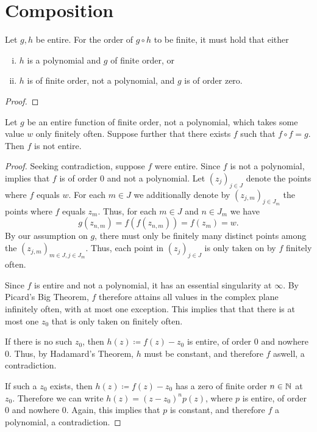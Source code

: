 \chapter{Composition}
\label{ch:composition}

\begin{theorem}[Pólya] \label{thm:polya}
    Let $g, h$ be entire. For the order of $g \circ h$ to be finite, it must hold that either
    \begin{enumerate}[i.]
        \item $h$ is a polynomial and $g$ of finite order, or
        \item $h$ is of finite order, not a polynomial, and $g$ is of order zero.
    \end{enumerate}
\end{theorem}

\begin{proof}
\end{proof}

\begin{theorem}[Thron] \label{thm:thron}
    Let $g$ be an entire function of finite order, not a polynomial, which takes some value $w$ only finitely often. Suppose further that there exists $f$ such that $f \circ f = g$. Then $f$ is not entire.
\end{theorem}

\begin{proof}
    Seeking contradiction, suppose $f$ were entire. Since $f$ is not a polynomial,  implies that $f$ is of order $0$ and not a polynomial. Let $(z_j)_{j \in J}$ denote the points where $f$ equals $w$. For each $m \in J$ we additionally denote by $(z_{j,m})_{j \in J_m}$ the points where $f$ equals $z_m$. Thus, for each $m \in J$ and $n \in J_m$ we have
    $$ g(z_{n,m}) = f(f(z_{n,m})) = f(z_m) = w. $$
    By our assumption on $g$, there must only be finitely many distinct points among the $(z_{j,m})_{m \in J, j \in J_m}$. Thus, each point in $(z_j)_{j \in J}$ is only taken on by $f$ finitely often.


    Since $f$ is entire and not a polynomial, it has an essential singularity at $\infty$. By Picard's Big Theorem, $f$ therefore attains all values in the complex plane infinitely often, with at most one exception. This implies that that there is at most one $z_0$ that is only taken on finitely often.

    If there is no such $z_0$, then $h(z) \coloneqq f(z) - z_0$ is entire, of order $0$ and nowhere $0$. Thus, by Hadamard's Theorem, $h$ must be constant, and therefore $f$ aswell, a contradiction.

    If such a $z_0$ exists, then $h(z) \coloneqq f(z) - z_0$ has a zero of finite order $n \in \mathbb{N}$ at $z_0$. Therefore we can write $h(z) = (z - z_0)^n p(z)$, where $p$ is entire, of order $0$ and nowhere $0$. Again, this implies that $p$ is constant, and therefore $f$ a polynomial, a contradiction.
\end{proof}

\begin{example}
\end{example}